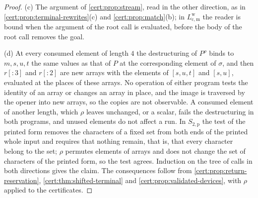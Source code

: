 \begin{proof}
(c) The argument of \cref{cert:prop:stream}, read in the other direction, as in
\cref{cert:prop:terminal-rewrites}(c) and \cref{cert:prop:match}(b); in
$L^{\mathrm w}_{\mathrm{c,m}}$ the reader is bound when the argument of the root
call is evaluated, before the body of the root call removes the goal.

(d) At every consumed element of length $4$ the destructuring of $P^{\rho}$
binds to $m,s,u,t$ the same values as that of $P$ at the corresponding element of
$\sigma$, and then $r[{:}3]$ and $r[{:}2]$ are new arrays with the elements of
$[s,u,t]$ and $[s,u]$, evaluated at the places of these arrays. No operation of
either program tests the identity of an array or changes an array in place, and
the image is traversed by the opener into new arrays, so the copies are not
observable. A consumed element of another length, which $\rho$ leaves unchanged,
or a scalar, fails the destructuring in both programs, and unused elements do not
affect a run. In $S_{2,\mathrm p}$ the test of the printed form removes the
characters of a fixed set from both ends of the printed whole input and requires
that nothing remain, that is, that every character belong to the set; $\rho$
permutes elements of arrays and does not change the set of characters of the
printed form, so the test agrees. Induction on the tree of calls in both
directions gives the claim. The consequences follow from
\cref{cert:prop:return-reservation}, \cref{cert:thm:shifted-terminal} and
\cref{cert:prop:validated-devices}, with $\rho$ applied to the certificates.
\end{proof}

